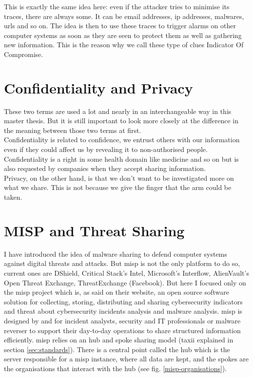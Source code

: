 \documentclass{eplmastersthesis}
\begin{document}
This is exactly the same idea here: even if the attacker tries to minimise its traces, there are always some. It can be email addresses, \gls{ip} addresses, malwares, \glspl{url} and so on.
The idea is then to use these traces to trigger alarms on other computer systems as soon as they are seen to protect them as well as gathering new information. This is the reason why we call these type of clues Indicator Of Compromise.

\section{Confidentiality and Privacy}
These two terms are used a lot and nearly in an interchangeable way in this master thesis. But it is still important to look more closely at the difference in the meaning between those two terms at first.\\

Confidentiality is related to confidence, we entrust others with our information even if they could affect us by revealing it to non-authorised people. Confidentiality is a right in some health domain like medicine and so on but is also requested by companies when they accept sharing information.\\

Privacy, on the other hand, is that we don't want to be investigated more on what we share. This is not because we give the finger that the arm could be taken.


\section{MISP and Threat Sharing}
I have introduced the idea of malware sharing to defend computer systems against digital threats and attacks. But \gls{misp} is not the only platform to do so, current ones are DShield, Critical Stack’s Intel, Microsoft’s Interflow, AlienVault’s Open Threat Exchange, ThreatExchange (Facebook).
But here I focused only on the \gls{misp} project which is, as said on their website, an open source software solution for collecting, storing, distributing and sharing cybersecurity indicators and threat about cybersecurity incidents analysis and malware analysis. \gls{misp} is designed by and for incident analysts, security and IT professionals or malware reverser to support their day-to-day operations to share structured information efficiently.
\gls{misp} relies on an hub and spoke sharing model (\gls{taxii} \cite{taxiiWebsite} explained in section \ref{sec:standards}). There is a central point called the hub which is the server responsible for a \gls{misp} instance, where all data are kept, and the spokes are the organisations that interact with the hub (see fig. \ref{misp-organisations}).\\
\end{document}
